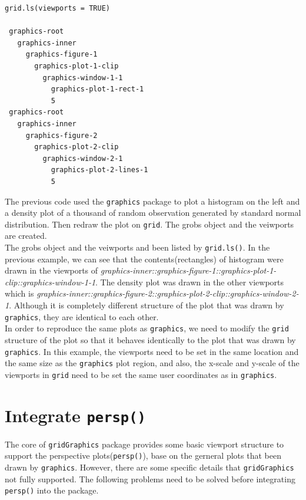 \documentclass[paper=a4, fontsize=11pt]{report}
\begin{document}
\newpage
\begin{lstlisting}
grid.ls(viewports = TRUE)

 graphics-root
   graphics-inner
     graphics-figure-1
       graphics-plot-1-clip
         graphics-window-1-1
           graphics-plot-1-rect-1
           5
 graphics-root
   graphics-inner
     graphics-figure-2
       graphics-plot-2-clip
         graphics-window-2-1
           graphics-plot-2-lines-1
           5

\end{lstlisting}
The previous code used the \texttt{graphics} package to plot a histogram on the left and a density plot of a 
thousand of random observation generated by standard normal distribution. Then redraw the plot on \texttt{grid}. The grobs object and the veiwports are created. \\

The grobs object and the veiwports and been listed by \texttt{grid.ls()}. In the previous example, we can see that the contents(rectangles) of histogram were drawn in the viewports of \textit{graphics-inner::graphics-figure-1::graphics-plot-1-clip::graphics-window-1-1}. The density plot was drawn in the other viewports which is \textit{graphics-inner::graphics-figure-2::graphics-plot-2-clip::graphics-window-2-1}. Although it is completely different structure of the plot that was drawn by \texttt{graphics}, they are identical to each other.\\

In order to reproduce the same plots as \texttt{graphics}, we need to modify the \texttt{grid} structure  of the plot so that it behaves identically to the plot that was drawn by \texttt{graphics}. In this example, the viewports need to be set in the same location and the same size as the \texttt{graphics} plot region, and also, the x-scale and y-scale of the viewports in \texttt{grid} need to be set the same user coordinates as in \texttt{graphics}.\\

\section{Integrate \texttt{persp()}}
The core of \texttt{gridGraphics} package provides some basic viewport structure to support the perspective plots(\texttt{persp()}), base on the gerneral plots that been drawn by \texttt{graphics}. However, there are some specific details that \texttt{gridGraphics} not fully supported. The following problems need to be solved before integrating \texttt{persp()} into the package. \\
\end{document}
